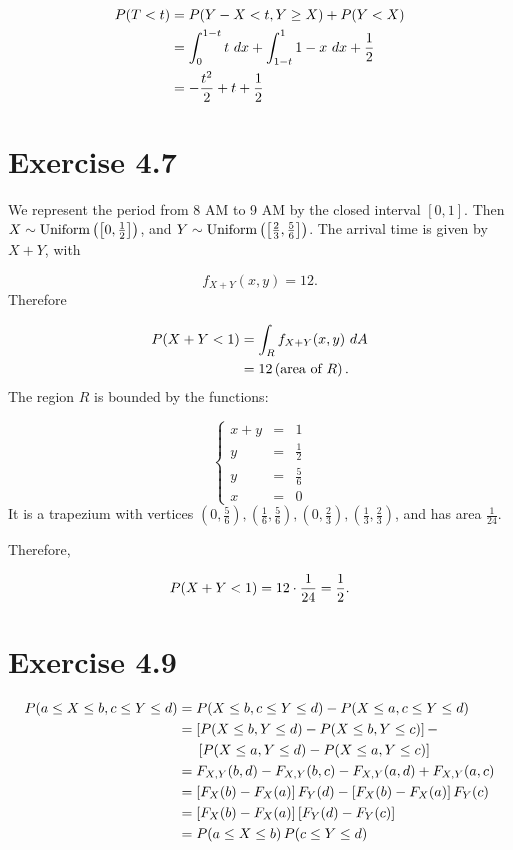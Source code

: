 \documentclass[12pt,letterpaper,reqno]{amsart}
\numberwithin{equation}{subsection}
\begin{document}
\begin{align*}
    \fun{P}{T < t} &= \fun{P}{Y-X < t, Y \geq X} + \fun{P}{Y < X} \\
    &= \myint{t}{x}{0}{1-t} + \myint{1-x}{x}{1-t}{1} + \frac{1}{2} \\
    &= -\frac{t^2}{2} + t + \frac{1}{2}
\end{align*}

\newpage
\section{Exercise 4.7}

We represent the period from 8 AM to 9 AM by the closed interval $[0,1]$. Then $X \sim \uniformdist{ \left[ 0, \frac{1}{2} \right]}$, and $Y \sim \uniformdist{ \left[ \frac{2}{3}, \frac{5}{6} \right]}$. The arrival time is given by $X + Y$, with

\[ f_{X+Y}(x,y) = 12. \]
Therefore

\begin{align*}
    \fun{P}{X + Y < 1} &= \myint{f_{X+Y}(x,y)}{A}{R}{} \\
    &= 12 \left( \mbox{area of $R$} \right).
\end{align*}
The region $R$ is bounded by the functions:

\[ \left\{ \begin{array}{ccl}
     x+ y &=& 1  \\
     y &=& \frac{1}{2} \\
     y &=& \frac{5}{6} \\
     x &=& 0
\end{array} \right. \]
It is a trapezium with vertices $\left( 0, \frac{5}{6} \right), \left( \frac{1}{6}, \frac{5}{6} \right), \left( 0, \frac{2}{3} \right), \left( \frac{1}{3}, \frac{2}{3} \right)$, and has area $\frac{1}{24}$.

Therefore,

\[ \fun{P}{X+Y < 1} = 12 \cdot \frac{1}{24} = \frac{1}{2}. \]

\newpage
\section{Exercise 4.9}

\begin{align*}
    \fun{P}{a \leq X \leq b, c \leq Y \leq d} &= \fun{P}{X \leq b , c \leq Y \leq d} - \fun{P}{X \leq a, c \leq Y \leq d} \\
    &= \left[ \fun{P}{X \leq b, Y \leq d} - \fun{P}{X \leq b, Y \leq c} \right] - \\
    & \ \ \ \ \left[ \fun{P}{X \leq a, Y \leq d} - \fun{P}{X \leq a, Y \leq c} \right] \\
    &= \fun{F_{X,Y}}{b,d} - \fun{F_{X,Y}}{b,c} - \fun{F_{X,Y}}{a,d} + \fun{F_{X,Y}}{a,c} \\
    &= \left[ \fun{F_X}{b} - \fun{F_X}{a} \right] \fun{F_Y}{d} - \left[ \fun{F_X}{b} - \fun{F_X}{a} \right] \fun{F_Y}{c} \\
    &= \left[ \fun{F_X}{b} - \fun{F_X}{a} \right] \left[ \fun{F_Y}{d} - \fun{F_Y}{c} \right] \\
    &= \fun{P}{a \leq X \leq b} \fun{P}{c \leq Y \leq d}
\end{align*}
\end{document}
